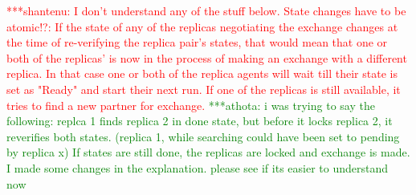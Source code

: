 \documentclass{rspublic}
\newcommand{\jhanote}[1]{ {\textcolor{red} { ***shantenu: #1 }}}
\newcommand{\alnote}[1]{ {\textcolor{blue} { ***andre: #1 }}}
\newcommand{\athotanote}[1]{ {\textcolor{green} { ***athota: #1 }}}
\newcommand{\alnote}[1]{}
\newcommand{\athotanote}[1]{}
\newcommand{\jhanote}[1]{}
\begin{document}
\jhanote{I don't understand any of the stuff below. State changes have
  to be atomic!?:  If the state of any of the replicas negotiating the
exchange changes at the time of re-verifying the replica pair's
states, that would mean that one or both of the replicas' is now in
the process of making an exchange with a different replica. In that
case one or both of the replica agents will wait till their state is
set as "Ready" and start their next run. If one of the replicas is
still available, it tries to find a new partner for exchange.} \athotanote{i was trying to say the following: replca 1 finds replica 2 in done state, but before it locks replica 2, it reverifies both states. (replica 1, while searching  could have been set to pending by replica x) If states are still done, the replicas are locked and exchange is made. I made some changes in the explanation. please see if its easier to understand now}

\end{document}
